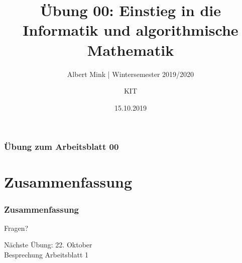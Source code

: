 \documentclass[c,18pt]{beamer}
\date{15.10.2019}
\title[Übung 00: Einstieg in die Informatik und algorithmische Mathematik]
  {Übung 00: Einstieg in die Informatik und algorithmische Mathematik}
\subtitle{Albert Mink | Wintersemester 2019/2020}
\author[Albert Mink, ]{KIT}
\institute[Institut für Angewandte und Numerische Mathematik (IANM)]{Institut für Angewandte und Numerische Mathematik}
\begin{document}
\begin{frame}
  \maketitle
\end{frame}

\begin{frame}
  \frametitle{Übung zum Arbeitsblatt 00}%
\tableofcontents[hideallsubsections]
\end{frame}

\def\kap{1}%
\def\kap{2}%
\def\kap{3}%
\def\kap{4}%

\def\kap{5}%
\def\kap{6}%


\section{Zusammenfassung}
\begin{frame}
  \frametitle{Zusammenfassung}%
\tableofcontents[hideallsubsections]
\end{frame}

\begin{frame}
\centering
\Huge\textcolor{KITgreen}{Fragen?}
\vspace{2cm}

{\LARGE
N\"achste \"Ubung: 22. Oktober\\
Besprechung Arbeitsblatt 1
}
\end{frame}


\end{document}
